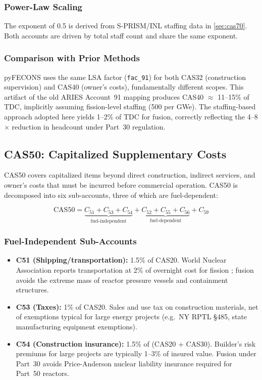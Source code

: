 \documentclass{article}
\begin{document}
\subsubsection{Power-Law Scaling}
The exponent of 0.5 is derived from S-PRISM/INL staffing data in
\cref{sec:cas70}. Both accounts are driven by total staff count and
share the same exponent.

\subsubsection{Comparison with Prior Methods}
pyFECONS uses the same LSA factor (\texttt{fac\_91}) for both CAS32
(construction supervision) and CAS40 (owner's costs), fundamentally
different scopes. This artifact of the old ARIES Account~91 mapping
produces CAS40 $\approx$ 11--15\% of TDC, implicitly assuming
fission-level staffing (500 per GWe). The staffing-based
approach adopted here yields 1--2\% of TDC for fusion, correctly reflecting the
4--8$\times$ reduction in headcount under Part~30 regulation.


\subsection{CAS50: Capitalized Supplementary Costs}
\label{sec:cas50}

CAS50 covers capitalized items beyond direct construction, indirect
services, and owner's costs that must be incurred before commercial
operation. CAS50 is decomposed into six sub-accounts, three of which
are fuel-dependent:

\begin{equation}
\label{eq:cas50}
\text{CAS50} = \underbrace{C_{51} + C_{53} + C_{54}}_{\text{fuel-independent}}
             + \underbrace{C_{52} + C_{55} + C_{56}}_{\text{fuel-dependent}}
             + C_{59}
\end{equation}

\subsubsection{Fuel-Independent Sub-Accounts}
\begin{itemize}
\item \textbf{C51 (Shipping/transportation):} 1.5\% of CAS20. World
  Nuclear Association reports transportation at 2\% of overnight
  cost for fission \citep{wna2025}; fusion avoids the extreme mass of
  reactor pressure vessels and containment structures.
\item \textbf{C53 (Taxes):} 1\% of CAS20. Sales and use tax on
  construction materials, net of exemptions typical for large energy
  projects (e.g.\ NY RPTL \S485, state manufacturing equipment exemptions).
\item \textbf{C54 (Construction insurance):} 1.5\% of (CAS20 + CAS30).
  Builder's risk premiums for large projects are typically 1--3\% of
  insured value. Fusion under Part~30 avoids Price-Anderson nuclear
  liability insurance required for Part~50 reactors.
\end{itemize}
\end{document}
